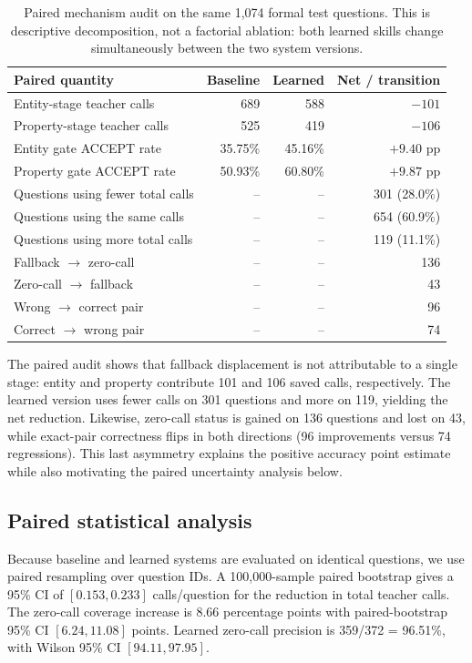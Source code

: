 \documentclass[10pt]{article}
\begin{document}
\begin{table}[t]
\centering
\caption{Paired mechanism audit on the same 1,074 formal test questions. This is
descriptive decomposition, not a factorial ablation: both learned skills change
simultaneously between the two system versions.}
\label{tab:paired-audit}
\small
\begin{tabular}{lrrr}
\toprule
Paired quantity & Baseline & Learned & Net / transition \\
\midrule
Entity-stage teacher calls & 689 & 588 & $-101$ \\
Property-stage teacher calls & 525 & 419 & $-106$ \\
Entity gate ACCEPT rate & 35.75\% & 45.16\% & $+9.40$ pp \\
Property gate ACCEPT rate & 50.93\% & 60.80\% & $+9.87$ pp \\
\midrule
Questions using fewer total calls & -- & -- & 301 (28.0\%) \\
Questions using the same calls & -- & -- & 654 (60.9\%) \\
Questions using more total calls & -- & -- & 119 (11.1\%) \\
\midrule
Fallback $\rightarrow$ zero-call & -- & -- & 136 \\
Zero-call $\rightarrow$ fallback & -- & -- & 43 \\
Wrong $\rightarrow$ correct pair & -- & -- & 96 \\
Correct $\rightarrow$ wrong pair & -- & -- & 74 \\
\bottomrule
\end{tabular}
\end{table}

The paired audit shows that fallback displacement is not attributable to a
single stage: entity and property contribute 101 and 106 saved calls,
respectively. The learned version uses fewer calls on 301 questions and more on
119, yielding the net reduction. Likewise, zero-call status is gained on 136
questions and lost on 43, while exact-pair correctness flips in both directions
(96 improvements versus 74 regressions). This last asymmetry explains the
positive accuracy point estimate while also motivating the paired uncertainty
analysis below.


\subsection{Paired statistical analysis}
Because baseline and learned systems are evaluated on identical questions, we use paired resampling over question IDs. A 100,000-sample paired bootstrap gives a 95\% CI of $[0.153,0.233]$ calls/question for the reduction in total teacher calls. The zero-call coverage increase is 8.66 percentage points with paired-bootstrap 95\% CI $[6.24,11.08]$ points. Learned zero-call precision is 359/372 = 96.51\%, with Wilson 95\% CI $[94.11,97.95]$.
\end{document}
